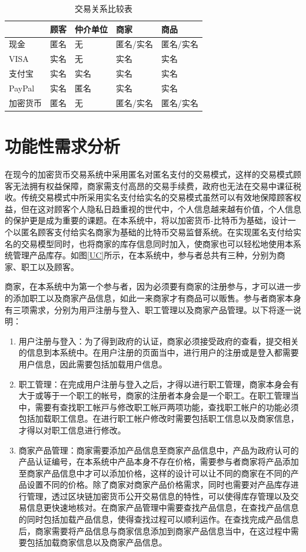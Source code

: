 		\begin{table}[!htbp]
		\centering
		\caption{交易关系比较表}
		\label{txvs}
		\begin{tabular}{|l|l|l|l|l|}
		\hline
		 & 顾客 & 仲介单位 & 商家 & 商品 \\ \hline
		现金 & 匿名 & 无 & 匿名/实名 & 匿名/实名 \\ \hline
		VISA & 实名 & 无 & 实名 & 实名 \\ \hline
		支付宝 & 实名 & 实名 & 实名 & 实名 \\ \hline
		PayPal & 实名 & 匿名 & 实名 & 实名 \\ \hline
		加密货币 & 匿名 & 无 & 匿名/实名 & 匿名/实名 \\ \hline
		\end{tabular}
		\end{table}

\section{功能性需求分析}

在现今的加密货币交易系统中采用匿名对匿名⽀付的交易模式，这样的交易模式顾客无法拥有权益保障，商家需支付高昂的交易手续费，政府也无法在交易中课征税收。传统交易模式中所采用实名⽀付给实名的交易模式虽然可以有效地保障顾客权益，但在这对顾客个⼈隐私⽇趋重视的世代中，个⼈信息越来越有价值，个⼈信息的保护更是成为重要的课题。在本系统中，将以加密货币-⽐特币为基础，设计⼀个以匿名顾客⽀付给实名商家为基础的比特币交易监督系统。在实现匿名⽀付给实名的交易模型同时，也将商家的库存信息同时加⼊，使商家也可以轻松地使用本系统管理产品库存。如图\ref{UC}所示，在本系统中，参与者总共有三种，分别为商家、职⼯以及顾客。

商家，在本系统中为第⼀个参与者，因为必须要有商家的注册参与，才可以进⼀步的添加职⼯以及商家产品信息，如此⼀来商家才有商品可以贩售。参与者商家本⾝有三项需求，分别为⽤⼾注册与登⼊、职⼯管理以及商家产品管理。以下将逐⼀说明：


	\begin{enumerate}
	\item 用户注册与登入：为了得到政府的认证，商家必须接受政府的查看，提交相关的信息到本系统中。在用户注册的页面当中，进行用户的注册或是登入都需要用户信息，因此需要包括加载用户信息。
	\item 职工管理：在完成用户注册与登入之后，才得以进行职工管理，商家本身会有大于或等于一个职工的帐号，商家的注册者本身会是一个职工。在职工管理当中，需要有查找职⼯帐⼾与修改职⼯帐⼾两项功能，查找职工帐户的功能必须包括加载职工信息。在进行职工帐户修改时需要包括职工信息以及商家信息，才得以对职工信息进行修改。
	\item 商家产品管理：商家需要添加产品信息至商家产品信息中，产品为政府认可的产品认证编号，在本系统中产品本身不存在价格，需要参与者商家将产品添加至商家产品信息中才可以添加价格，这样的设计可以让不同的商家在不同的产品设置不同的价格。除了商家对商家产品价格需求，同时也需要对产品库存进行管理，透过区块链加密货币公开交易信息的特性，可以使得库存管理以及交易信息更快速地核对。在商家产品管理中需要查找产品信息，在查找产品信息的同时包括加载产品信息，使得查找过程可以顺利运作。在查找完成产品信息后，商家需要将产品信息与商家信息添加到商家产品信息当中，在这过程中需要包括加载商家信息以及商家产品信息。

	\end{enumerate}


